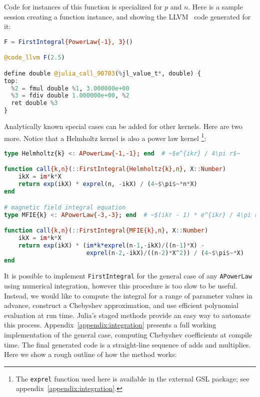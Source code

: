 Code for instances of this function is specialized for $p$ and $n$.
Here is a sample session creating a function instance, and showing the
LLVM~\cite{LLVM} code generated for it:

\begin{singlespace}
\begin{lstlisting}[language=julia]
F = FirstIntegral{PowerLaw{-1}, 3}()

@code_llvm F(2.5)

define double @julia_call_90703(%jl_value_t*, double) {
top:
  %2 = fmul double %1, 3.000000e+00
  %3 = fdiv double 1.000000e+00, %2
  ret double %3
}
\end{lstlisting}
\end{singlespace}

Analytically known special cases can be added for other kernels.
Here are two more.
Notice that a Helmholtz kernel is also a power law kernel
\footnote{The \texttt{exprel} function used here is available in the
external GSL package; see appendix~\ref{appendix:integration}.}:

\begin{singlespace}
\begin{lstlisting}[language=julia]
type Helmholtz{k} <: APowerLaw{-1,-1}; end  # ~$e^{ikr} / 4\pi r$~

function call{k,n}(::FirstIntegral{Helmholtz{k},n}, X::Number)
    ikX = im*k*X
    return exp(ikX) * exprel(n, -ikX) / (4~$\pi$~*n*X)
end

# magnetic field integral equation
type MFIE{k} <: APowerLaw{-3,-3}; end  # ~$(ikr - 1) * e^{ikr} / 4\pi r^3$~

function call{k,n}(::FirstIntegral{MFIE{k},n}, X::Number)
    ikX = im*k*X
    return exp(ikX) * (im*k*exprel(n-1,-ikX)/((n-1)*X) -
                       exprel(n-2,-ikX)/((n-2)*X^2)) / (4~$\pi$~*X)
end
\end{lstlisting}
\end{singlespace}

It is possible to implement \texttt{FirstIntegral} for the general
case of any \texttt{APowerLaw} using numerical integration, however
this procedure is too slow to be useful.
Instead, we would like to compute the integral for a range of
parameter values in advance, construct a Chebyshev approximation,
and use efficient polynomial evaluation at run time.
Julia's staged methods provide an easy way to automate this process.
Appendix~\ref{appendix:integration} presents a full working implementation of
the general case, computing Chebyshev coefficients at compile time.
The final generated code is a straight-line sequence of adds and multiplies.
Here we show a rough outline of how the method works:

